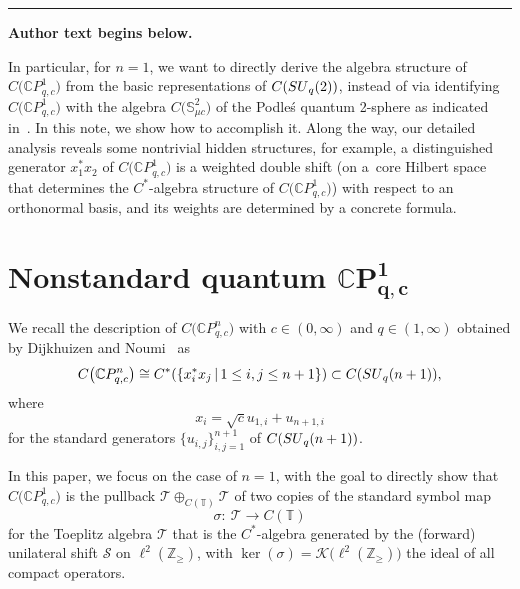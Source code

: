 \documentclass[11pt]{article}
\numberwithin{equation}{section}
\begin{document}
\medskip\hrule\medskip\noindent\textbf{Author text begins below.}\par
\setcounter{section}{1}
In particular, for $n=1$, we want to directly derive the algebra structure of
$C\big( \mathbb{C}P_{q,c}^{1}\big) $ from the basic representations of
$C( {\rm SU}_{q}(2)) $, instead of via identifying
$C\big( \mathbb{C}P_{q,c}^{1}\big) $ with the algebra $C\big(\mathbb{S}_{\mu c}^{2}\big) $ of the Podle\'{s} quantum 2-sphere \cite{Po}
as indicated in~\cite{DiNo, KoVa}. In this note, we show how to accomplish it.
Along the way, our detailed analysis reveals some nontrivial hidden
structures, for example, a distinguished generator $x_{1}^{\ast}x_{2}$ of
$C\big( \mathbb{C}P_{q,c}^{1}\big) $ is a weighted double shift (on a~core Hilbert space that determines the $C^*$-algebra structure of $C\big(\mathbb{C}P_{q,c}^{1}\big) $) with respect to an orthonormal basis, and its weights are determined by a concrete formula.

\section[Nonstandard quantum $\mathbb{C}P_{q,c}^{1}$]{Nonstandard quantum $\boldsymbol{\mathbb{C}P_{q,c}^{1}}$}

We recall the description of $C\big( \mathbb{C}P_{q,c}^{n}\big) $ with
$c\in ( 0,\infty ) $ and $q\in ( 1,\infty ) $ obtained
by Dijkhuizen and Noumi~\cite{DiNo} as
\[
C\big(\mathbb{C}P_{q,c}^{n}\big)\cong C^{\ast}(\{x_{i}^{\ast}x_{j}\,|\,1\leq i,j\leq
n+1\})\subset C ( {\rm SU}_{q}(n+1) ),
\]
where
\[
x_{i}=\sqrt{c}u_{1,i}+u_{n+1,i}
\]
for the standard generators $\{ u_{i,j}\} _{i,j=1}^{n+1}$ of $C( {\rm SU}_{q}(n+1))$.

In this paper, we focus on the case of $n=1$, with the goal to directly show
that $C\big( \mathbb{C}P_{q,c}^{1}\big) $ is the pullback $\mathcal{T}\oplus_{C( \mathbb{T}) }\mathcal{T}$ of two copies of the
standard symbol map
\[
\sigma\colon \ \mathcal{T}\rightarrow C ( \mathbb{T} )
\]
for the Toeplitz algebra $\mathcal{T}$ that is the $C^*$-algebra generated by the
(forward) unilateral shift $\mathcal{S}$ on $\ell^{2}( \mathbb{Z}_{\geq
}) $, with $\ker( \sigma) =\mathcal{K}\big( \ell
^{2} ( \mathbb{Z}_{\geq} )\big) $ the ideal of all compact operators.
\end{document}
